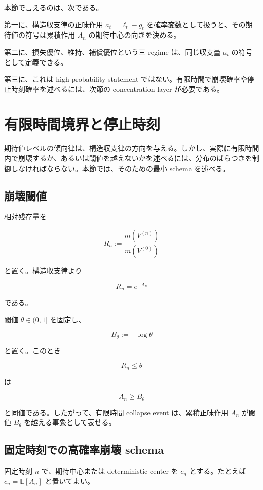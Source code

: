 \documentclass[12pt,a4paper]{article}
\begin{document}
本節で言えるのは、次である。

第一に、構造収支律の正味作用 \(a_{t}=\ell_{t}-g_{t}\) を確率変数として扱うと、その期待値の符号は累積作用 \(A_{n}\) の期待中心の向きを決める。

第二に、損失優位、維持、補償優位という三 regime は、同じ収支量 \(a_{t}\) の符号として定義できる。

第三に、これは high-probability statement ではない。有限時間で崩壊確率や停止時刻確率を述べるには、次節の concentration layer が必要である。

\section{有限時間境界と停止時刻}\label{ux6709ux9650ux6642ux9593ux5883ux754cux3068ux505cux6b62ux6642ux523b}

期待値レベルの傾向律は、構造収支律の方向を与える。しかし、実際に有限時間内で崩壊するか、あるいは閾値を越えないかを述べるには、分布のばらつきを制御しなければならない。本節では、そのための最小 schema を述べる。

\subsection{崩壊閾値}\label{ux5d29ux58caux95beux5024}

相対残存量を

\[
R_{n} := \frac{m(V^{(n)})}{m(V^{(0)})}
\]

と置く。構造収支律より

\[
R_{n} = e^{-A_{n}}
\]

である。

閾値 \(\theta\in(0,1]\) を固定し、

\[
B_\theta := -\log \theta
\]

と置く。このとき

\[
R_{n} \le \theta
\]

は

\[
A_{n} \ge B_\theta
\]

と同値である。したがって、有限時間 collapse event は、累積正味作用 \(A_{n}\) が閾値 \(B_\theta\) を越える事象として表せる。

\subsection{固定時刻での高確率崩壊 schema}\label{ux56faux5b9aux6642ux523bux3067ux306eux9ad8ux78baux7387ux5d29ux58ca-schema}

固定時刻 \(n\) で、期待中心または deterministic center を \(c_{n}\) とする。たとえば \(c_{n}=\mathbb E[A_{n}]\) と置いてよい。
\end{document}
